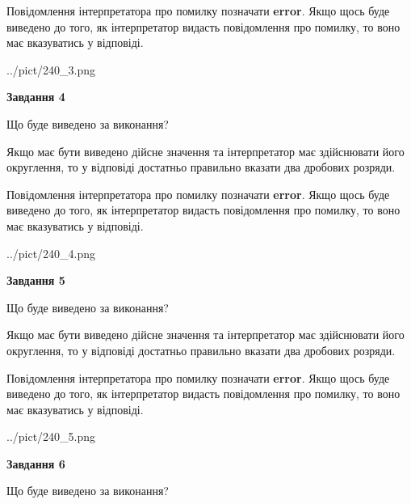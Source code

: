 \documentclass[12pt, ukrainian]{article}
\begin{document}
{\begin {Large}
Повідомлення інтерпретатора про помилку позначати \textbf{error}.
Якщо щось буде виведено до того, як інтерпретатор видасть повідомлення про помилку, 
то воно має вказуватись у відповіді. \par

\begin{center}
	{../pict/240_3.png}
\end{center}
\newpage

{\begin {center}\textbf{Завдання 4}\end {center}}\par
Що буде виведено за виконання? \par

Якщо має бути виведено дійсне значення та інтерпретатор має здійснювати його округлення, 
то у відповіді достатньо правильно вказати два дробових розряди.

Повідомлення інтерпретатора про помилку позначати \textbf{error}.
Якщо щось буде виведено до того, як інтерпретатор видасть повідомлення про помилку, 
то воно має вказуватись у відповіді. \par

\begin{center}
	{../pict/240_4.png}
\end{center}
\newpage

{\begin {center}\textbf{Завдання 5}\end {center}}\par
Що буде виведено за виконання? \par

Якщо має бути виведено дійсне значення та інтерпретатор має здійснювати його округлення, 
то у відповіді достатньо правильно вказати два дробових розряди.

Повідомлення інтерпретатора про помилку позначати \textbf{error}.
Якщо щось буде виведено до того, як інтерпретатор видасть повідомлення про помилку, 
то воно має вказуватись у відповіді. \par

\begin{center}
	{../pict/240_5.png}
\end{center}
\newpage

{\begin {center}\textbf{Завдання 6}\end {center}}\par
Що буде виведено за виконання? \par


\end{Large}}
\end{document}
